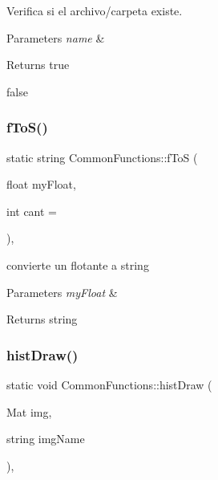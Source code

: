 Verifica si el archivo/carpeta existe. 


\begin{DoxyParams}{Parameters}
{\em name} & \\
\hline
\end{DoxyParams}
\begin{DoxyReturn}{Returns}
true 

false 
\end{DoxyReturn}
\mbox{\label{classCommonFunctions_a54f92a4fbce258e4c73bbdcb2f37a594}} 
\subsubsection{\texorpdfstring{f\+To\+S()}{fToS()}}
{\footnotesize\ttfamily static string Common\+Functions\+::f\+ToS (\begin{DoxyParamCaption}\item[{float}]{my\+Float,  }\item[{int}]{cant = {} }\end{DoxyParamCaption})\hspace{0.3cm}{\ttfamily [inline]}, {\ttfamily [static]}}



convierte un flotante a string 


\begin{DoxyParams}{Parameters}
{\em my\+Float} & \\
\hline
\end{DoxyParams}
\begin{DoxyReturn}{Returns}
string 
\end{DoxyReturn}
\mbox{\label{classCommonFunctions_a7b0e52ec4c30af5244724936f163c2d1}} 
\subsubsection{\texorpdfstring{hist\+Draw()}{histDraw()}}
{\footnotesize\ttfamily static void Common\+Functions\+::hist\+Draw (\begin{DoxyParamCaption}\item[{Mat}]{img,  }\item[{string}]{img\+Name }\end{DoxyParamCaption})\hspace{0.3cm}{\ttfamily [inline]}, {\ttfamily [static]}}



